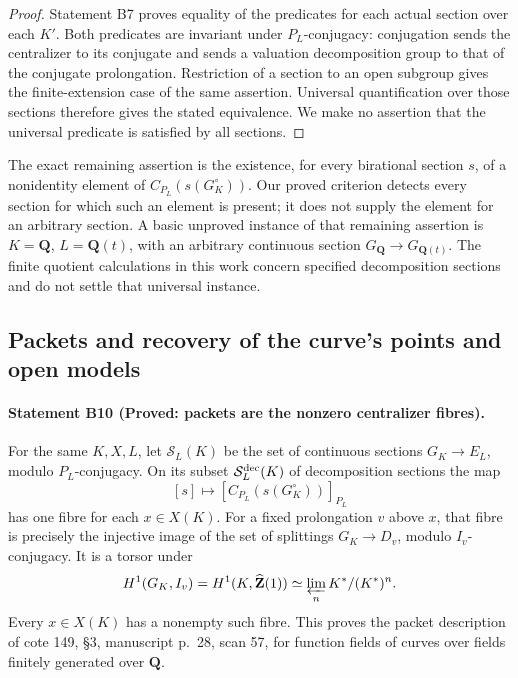 \begin{proof}
Statement B7 proves equality of the predicates for each actual section
over each $K'$. Both predicates are invariant under $P_L$-conjugacy:
conjugation sends the centralizer to its conjugate and sends a valuation
decomposition group to that of the conjugate prolongation. Restriction
of a section to an open subgroup gives the finite-extension case of the
same assertion. Universal quantification over those sections therefore
gives the stated equivalence. We make no assertion that the universal
predicate is satisfied by all sections.
\end{proof}

The exact remaining assertion is the existence, for every birational
section $s$, of a nonidentity element of
$C_{P_L}(s(G_K^\circ))$. Our proved criterion detects every section for
which such an element is present; it does not supply the element for an
arbitrary section. A basic unproved instance of that remaining assertion
is $K=\mathbf Q$, $L=\mathbf Q(t)$, with an arbitrary continuous section
$G_{\mathbf Q}\to G_{\mathbf Q(t)}$. The finite quotient calculations
in this work concern specified decomposition sections and do not settle
that universal instance.

\subsection{Packets and recovery of the curve's points and open models}

\paragraph{Statement B10 (Proved: packets are the nonzero centralizer fibres).}\label{res:B10}
For the same $K,X,L$, let $\mathcal S_L(K)$ be the set of continuous
sections $G_K\to E_L$, modulo $P_L$-conjugacy. On its subset
$\mathcal S_L^{\rm dec}(K)$ of decomposition sections the map
\[
 [s]\longmapsto[C_{P_L}(s(G_K^\circ))]_{P_L}
\]
has one fibre for each $x\in X(K)$. For a fixed prolongation $v$ above
$x$, that fibre is precisely the injective image of the set of splittings
$G_K\to D_v$, modulo $I_v$-conjugacy. It is a torsor under
\[
 H^1(G_K,I_v)=H^1(K,\widehat{\mathbf Z}(1))
 \simeq\varprojlim_n K^*/(K^*)^n.
\]
Every $x\in X(K)$ has a nonempty such fibre. This proves the packet
description of cote 149, \S3, manuscript p.~28, scan 57, for function
fields of curves over fields finitely generated over $\mathbf Q$.

